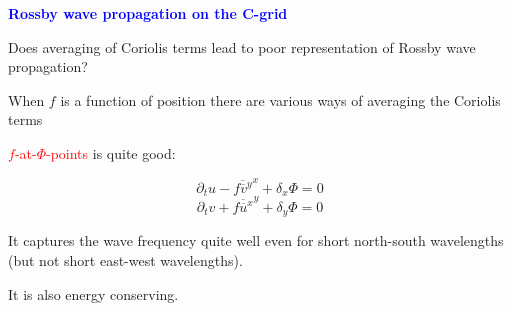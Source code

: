 \documentclass[a4]{seminar}
\newcommand{\R}[1]{\textcolor{red}{#1}}
\newcommand{\B}[1]{\textcolor{blue}{#1}}
\begin{document}
\begin{slide}

\B{\bf Rossby wave propagation on the C-grid}

\vspace{2mm}

Does averaging of Coriolis terms lead to poor representation of
Rossby wave propagation?

\begin{minipage}{47mm}
\end{minipage}
\begin{minipage}{50mm}
When \( f \) is a function of position there are various ways of
averaging the Coriolis terms
\end{minipage}


\end{slide}


\begin{slide}

\R{\( f \)-at-\(\Phi\)-points} is quite good:

\begin{displaymath}
\partial_t u - \overline{f \overline{v}^y}^x + \delta_x \Phi = 0
\end{displaymath}
\begin{displaymath}
\partial_t v + \overline{f \overline{u}^x}^y + \delta_y \Phi = 0
\end{displaymath}

It captures the wave frequency quite well even for short north-south wavelengths
(but not short east-west wavelengths).

\vspace{2mm}

It is also energy conserving.


\end{slide}


\begin{slide}

\begin{center}
\end{center}

\end{slide}

\end{document}
